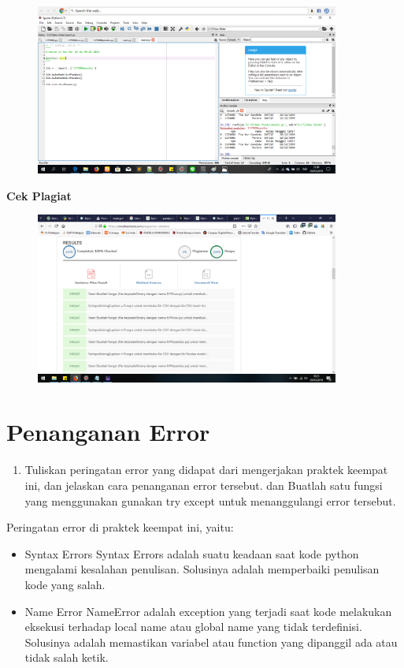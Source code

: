 \begin{enumerate}
\begin{figure}[H]
	\centering
\end{figure}
\begin{figure}[H]
	\includegraphics[width=10cm]{figures/4/1174086/k5.png}
	\centering
\end{figure}

\textbf{Cek Plagiat}
\begin{figure}[H]
	\includegraphics[width=10cm]{figures/4/1174086/plagiatketrampilan.png}
	\centering
\end{figure}
\section{Penanganan Error}
	\begin{enumerate}
	\item Tuliskan  peringatan  error  yang  didapat  dari  mengerjakan  praktek  keempat  ini, dan  jelaskan  cara  penanganan  error  tersebut.   dan  Buatlah  satu  fungsi  yang menggunakan gunakan try except untuk menanggulangi error tersebut.
	\end{enumerate}
	Peringatan error di praktek keempat ini, yaitu:
	\begin{itemize}
		\item Syntax Errors
		Syntax Errors adalah suatu keadaan saat kode python mengalami kesalahan penulisan. Solusinya adalah memperbaiki penulisan kode yang salah.
		
		\item Name Error
		NameError adalah exception yang terjadi saat kode melakukan eksekusi terhadap local name atau global name yang tidak terdefinisi. Solusinya adalah memastikan variabel atau function yang dipanggil ada atau tidak salah ketik.
		

\end{itemize}
\end{enumerate}
